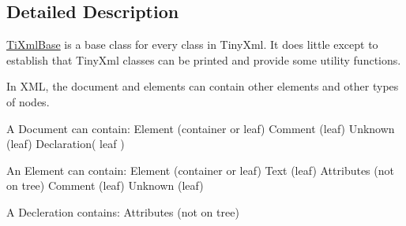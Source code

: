 \subsection{Detailed Description}
\hyperlink{class_ti_xml_base}{Ti\+Xml\+Base} is a base class for every class in Tiny\+Xml. It does little except to establish that Tiny\+Xml classes can be printed and provide some utility functions.

In X\+M\+L, the document and elements can contain other elements and other types of nodes.

\begin{DoxyVerb}A Document can contain: Element (container or leaf)
                        Comment (leaf)
                        Unknown (leaf)
                        Declaration( leaf )

An Element can contain: Element (container or leaf)
                        Text    (leaf)
                        Attributes (not on tree)
                        Comment (leaf)
                        Unknown (leaf)

A Decleration contains: Attributes (not on tree)
\end{DoxyVerb}
 

